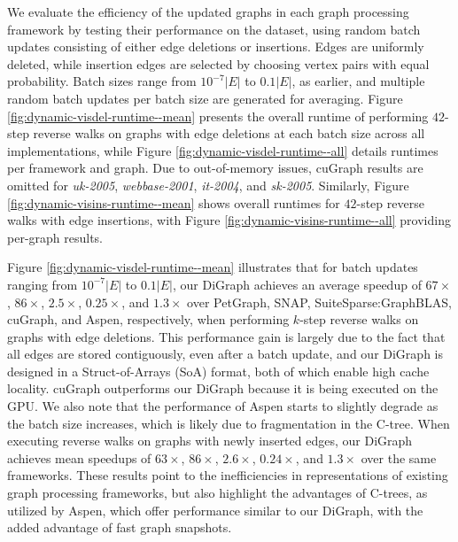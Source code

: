 We evaluate the efficiency of the updated graphs in each graph processing framework by testing their performance on the dataset, using random batch updates consisting of either edge deletions or insertions. Edges are uniformly deleted, while insertion edges are selected by choosing vertex pairs with equal probability. Batch sizes range from $10^{-7} |E|$ to $0.1|E|$, as earlier, and multiple random batch updates per batch size are generated for averaging. Figure \ref{fig:dynamic-visdel-runtime--mean} presents the overall runtime of performing $42$-step reverse walks on graphs with edge deletions at each batch size across all implementations, while Figure \ref{fig:dynamic-visdel-runtime--all} details runtimes per framework and graph. Due to out-of-memory issues, cuGraph results are omitted for \textit{uk-2005}, \textit{webbase-2001}, \textit{it-2004}, and \textit{sk-2005}. Similarly, Figure \ref{fig:dynamic-visins-runtime--mean} shows overall runtimes for $42$-step reverse walks with edge insertions, with Figure \ref{fig:dynamic-visins-runtime--all} providing per-graph results.



Figure \ref{fig:dynamic-visdel-runtime--mean} illustrates that for batch updates ranging from $10^{-7}|E|$ to $0.1|E|$, our DiGraph achieves an average speedup of $67\times$, $86\times$, $2.5\times$, $0.25\times$, and $1.3\times$ over PetGraph, SNAP, SuiteSparse:GraphBLAS, cuGraph, and Aspen, respectively, when performing $k$-step reverse walks on graphs with edge deletions. This performance gain is largely due to the fact that all edges are stored contiguously, even after a batch update, and our DiGraph is designed in a Struct-of-Arrays (SoA) format, both of which enable high cache locality. cuGraph outperforms our DiGraph because it is being executed on the GPU. We also note that the performance of Aspen starts to slightly degrade as the batch size increases, which is likely due to fragmentation in the C-tree. When executing reverse walks on graphs with newly inserted edges, our DiGraph achieves mean speedups of $63\times$, $86\times$, $2.6\times$, $0.24\times$, and $1.3\times$ over the same frameworks. These results point to the inefficiencies in representations of existing graph processing frameworks, but also highlight the advantages of C-trees, as utilized by Aspen, which offer performance similar to our DiGraph, with the added advantage of fast graph snapshots.








